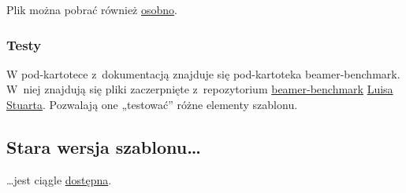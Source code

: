 \documentclass[12pt,aspectratio=169,ignorenonframetext]{beamer}
\begin{document}
Plik można pobrać również \href{http://kmim.wm.pwr.edu.pl/myszka/wp-content/uploads/sites/2/2018/11/oficyna_url.bst}{osobno}.

\subsubsection{Testy}

W pod-kartotece z~dokumentacją znajduje się pod-kartoteka beamer-benchmark. W~niej znajdują się pliki zaczerpnięte z~repozytorium \href{https://github.com/louisstuart96/beamer-benchmark}{beamer-benchmark} \href{https://github.com/louisstuart96}{Luisa Stuarta}. Pozwalają one „testować” różne elementy szablonu.

\subsection{Stara wersja szablonu…}

…jest ciągle \href{https://kmim.wm.pwr.edu.pl/myszka/projekty/szablon-prezentacji-pwr/szablon-prezentacji-zgodny-z-ksiega-logotypu/}{dostępna}.


\end{document}

